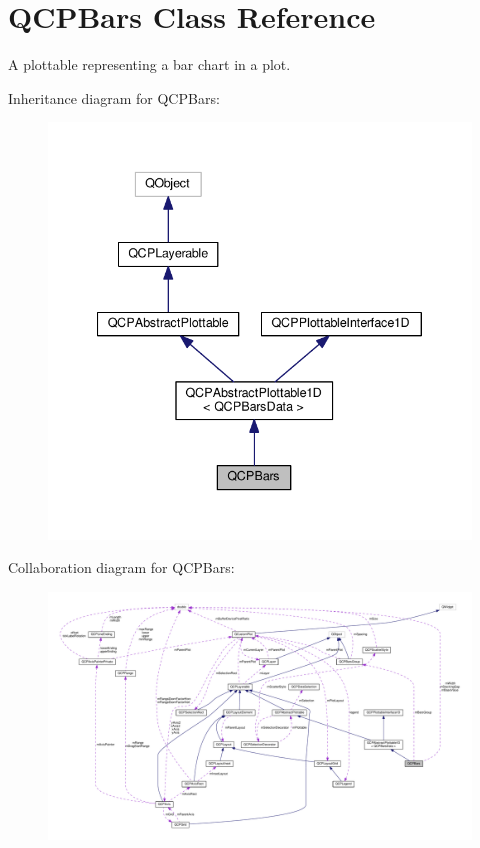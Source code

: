\hypertarget{classQCPBars}{}\section{Q\+C\+P\+Bars Class Reference}
\label{classQCPBars}


A plottable representing a bar chart in a plot.  




Inheritance diagram for Q\+C\+P\+Bars\+:
\nopagebreak
\begin{figure}[H]
\begin{center}
\leavevmode
\includegraphics[width=340pt]{classQCPBars__inherit__graph}
\end{center}
\end{figure}


Collaboration diagram for Q\+C\+P\+Bars\+:
\nopagebreak
\begin{figure}[H]
\begin{center}
\leavevmode
\includegraphics[width=350pt]{classQCPBars__coll__graph}
\end{center}
\end{figure}
